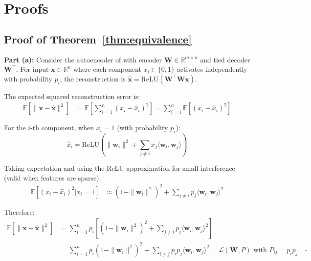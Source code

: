 \documentclass[10pt]{article} %
\theoremstyle{plain}
\theoremstyle{definition}
\theoremstyle{remark}
\begin{document}




\appendix

\section{Proofs}
\label{app:proofs}

\subsection{Proof of Theorem~\ref{thm:equivalence}}

\textbf{Part (a):} Consider the autoencoder of \citet{elhage2022toy} with encoder $\mathbf{W} \in \mathbb{R}^{m \times n}$ and tied decoder $\mathbf{W}^\top$. For input $\mathbf{x} \in \mathbb{R}^n$ where each component $x_i \in \{0, 1\}$ activates independently with probability $p_i$, the reconstruction is $\hat{\mathbf{x}} = \text{ReLU}(\mathbf{W}^\top \mathbf{W} \mathbf{x})$.

The expected squared reconstruction error is:
\begin{align}
\mathbb{E}[\|\mathbf{x} - \hat{\mathbf{x}}\|^2] &= \mathbb{E}\left[\sum_{i=1}^n (x_i - \hat{x}_i)^2\right] = \sum_{i=1}^n \mathbb{E}[(x_i - \hat{x}_i)^2]
\end{align}

For the $i$-th component, when $x_i = 1$ (with probability $p_i$):
\begin{equation}
\hat{x}_i = \text{ReLU}\left(\|\mathbf{w}_i\|^2 + \sum_{j \neq i} x_j \langle \mathbf{w}_i, \mathbf{w}_j \rangle\right)
\end{equation}

Taking expectation and using the ReLU approximation for small interference (valid when features are sparse):
\begin{align}
\mathbb{E}[(x_i - \hat{x}_i)^2 | x_i = 1] &\approx \left(1 - \|\mathbf{w}_i\|^2\right)^2 + \sum_{j \neq i} p_j \langle \mathbf{w}_i, \mathbf{w}_j \rangle^2
\end{align}

Therefore:
\begin{align}
\mathbb{E}[\|\mathbf{x} - \hat{\mathbf{x}}\|^2] &= \sum_{i=1}^n p_i \left[\left(1 - \|\mathbf{w}_i\|^2\right)^2 + \sum_{j \neq i} p_j \langle \mathbf{w}_i, \mathbf{w}_j \rangle^2\right] \\
&= \sum_{i=1}^n p_i (1 - \|\mathbf{w}_i\|^2)^2 + \sum_{i \neq j} p_i p_j \langle \mathbf{w}_i, \mathbf{w}_j \rangle^2 = \mathcal{L}(\mathbf{W}, P) \text{ with } P_{ij} = p_i p_j \quad \square
\end{align}
\end{document}

